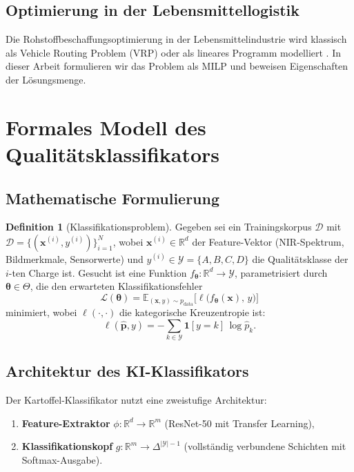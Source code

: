 \documentclass[a4paper, 12pt, twoside, openright]{report}
\theoremstyle{definition}
\newtheorem{definition}[theorem]{Definition}
\theoremstyle{definition}
\begin{document}
\subsection{Optimierung in der Lebensmittellogistik}

Die Rohstoffbeschaffungsoptimierung in der Lebensmittelindustrie wird
klassisch als Vehicle Routing Problem (VRP) oder als lineares Programm
modelliert \cite{ahumada2009,shukla2019}. In dieser Arbeit formulieren
wir das Problem als MILP und beweisen Eigenschaften der Lösungsmenge.


\section{Formales Modell des Qualitätsklassifikators}


\subsection{Mathematische Formulierung}

\begin{definition}[Klassifikationsproblem]
	Gegeben sei ein Trainingskorpus
	$\mathcal{D}$ mit $\mathcal{D} = \{(\mathbf{x}^{(i)}, y^{(i)})\}_{i=1}^{N}$,
	wobei $\mathbf{x}^{(i)} \in \mathbb{R}^d$ der Feature-Vektor
	(NIR-Spektrum, Bildmerkmale, Sensorwerte) und
	$y^{(i)} \in \mathcal{Y} = \{A, B, C, D\}$ die Qualitätsklasse der
	$i$-ten Charge ist. Gesucht ist eine Funktion
	$f_{\boldsymbol{\theta}} : \mathbb{R}^d \to \mathcal{Y}$,
	parametrisiert durch $\boldsymbol{\theta} \in \Theta$, die den
	erwarteten Klassifikationsfehler
	\[
	\mathcal{L}(\boldsymbol{\theta}) =
	\mathbb{E}_{(\mathbf{x}, y) \sim p_{\mathrm{data}}}
	\bigl[\ell\bigl(f_{\boldsymbol{\theta}}(\mathbf{x}),\, y\bigr)\bigr]
	\]
	minimiert, wobei $\ell(\cdot,\cdot)$ die kategorische Kreuzentropie ist:
	\[
	\ell(\hat{\mathbf{p}}, y) = -\sum_{k \in \mathcal{Y}}
	\mathbf{1}[y=k]\,\log\hat{p}_k.
	\]
\end{definition}

\subsection{Architektur des KI-Klassifikators}

Der Kartoffel-Klassifikator nutzt eine zweistufige Architektur:

\begin{enumerate}
	\item \textbf{Feature-Extraktor} $\phi : \mathbb{R}^d \to \mathbb{R}^m$
	(ResNet-50 \cite{he2016} mit Transfer Learning),
	\item \textbf{Klassifikationskopf} $g : \mathbb{R}^m \to \Delta^{|\mathcal{Y}|-1}$
	(vollständig verbundene Schichten mit Softmax-Ausgabe).
\end{enumerate}
\end{document}
